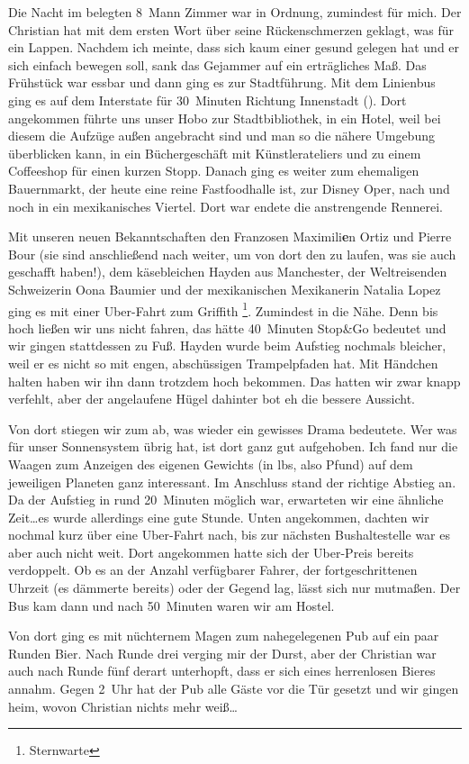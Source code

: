 Die Nacht im belegten 8~Mann Zimmer war in Ordnung, zumindest für mich.
Der Christian hat mit dem ersten Wort über seine Rückenschmerzen geklagt, was für ein Lappen.
Nachdem ich meinte, dass sich kaum einer gesund gelegen hat und er sich einfach bewegen soll, sank das Gejammer auf ein erträgliches Maß.
Das Frühstück war essbar und dann ging es zur Stadtführung.
Mit dem Linienbus ging es auf dem Interstate für 30~Minuten Richtung Innenstadt ().
Dort angekommen führte uns unser Hobo zur Stadtbibliothek, in ein Hotel, weil bei diesem die Aufzüge außen angebracht sind und man so die nähere Umgebung überblicken kann, in ein Büchergeschäft mit Künstlerateliers und zu einem Coffeeshop für einen kurzen Stopp.
Danach ging es weiter zum ehemaligen Bauernmarkt, der heute eine reine Fastfoodhalle ist, zur Disney Oper, nach  und noch in ein mexikanisches Viertel.
Dort war endete die anstrengende Rennerei.

Mit unseren neuen Bekanntschaften den Franzosen Maximili\textbf{e}n Ortiz und Pierre Bour (sie sind anschließend nach  weiter, um von dort den  zu laufen, was sie auch geschafft haben!), dem käsebleichen Hayden aus Manchester, der Weltreisenden Schweizerin Oona Baumier und der mexikanischen Mexikanerin Natalia Lopez ging es mit einer Uber-Fahrt zum Griffith \footnote{Sternwarte}.
Zumindest in die Nähe.
Denn bis hoch ließen wir uns nicht fahren, das hätte 40~Minuten Stop\&Go bedeutet und wir gingen stattdessen zu Fuß.
Hayden wurde beim Aufstieg nochmals bleicher, weil er es nicht so mit engen, abschüssigen Trampelpfaden hat.
Mit Händchen halten haben wir ihn dann trotzdem hoch bekommen.
Das  hatten wir zwar knapp verfehlt, aber der angelaufene Hügel dahinter bot eh die bessere Aussicht.

Von dort stiegen wir zum  ab, was wieder ein gewisses Drama bedeutete.
Wer was für unser Sonnensystem übrig hat, ist dort ganz gut aufgehoben.
Ich fand nur die Waagen zum Anzeigen des eigenen Gewichts (in lbs, also Pfund) auf dem jeweiligen Planeten ganz interessant.
Im Anschluss stand der richtige Abstieg an.
Da der Aufstieg in rund 20~Minuten möglich war, erwarteten wir eine ähnliche Zeit\dots es wurde allerdings eine gute Stunde.
Unten angekommen, dachten wir nochmal kurz über eine Uber-Fahrt nach, bis zur nächsten Bushaltestelle war es aber auch nicht weit.
Dort angekommen hatte sich der Uber-Preis bereits verdoppelt.
Ob es an der Anzahl verfügbarer Fahrer, der fortgeschrittenen Uhrzeit (es dämmerte bereits) oder der Gegend lag, lässt sich nur mutmaßen.
Der Bus kam dann und nach 50~Minuten waren wir am Hostel.

Von dort ging es mit nüchternem Magen zum nahegelegenen Pub  auf ein paar Runden Bier.
Nach Runde drei verging mir der Durst, aber der Christian war auch nach Runde fünf derart unterhopft, dass er sich eines herrenlosen Bieres annahm.
Gegen 2~Uhr hat der Pub alle Gäste vor die Tür gesetzt und wir gingen heim, wovon Christian nichts mehr weiß\dots
